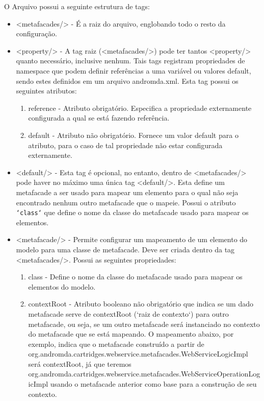O Arquivo possui a seguinte estrutura de tags:

\begin{itemize}
  \item <metafacades/> - É a raiz do arquivo, englobando todo o resto da 
  configuração. 
  \item <property/> - A tag raiz (<metafacades/>) pode ter tantos <property/>
  quanto necessário, inclusive nenhum. Tais tags registram propriedades
  de namespace que podem definir referências a uma variável ou valores default,
  sendo estes definidos em um arquivo andromda.xml. Esta tag possui os seguintes
  atributos:
  \begin{enumerate}
    \item reference - Atributo obrigatório. Especifica a propriedade
    externamente configurada a qual se está fazendo referência.
    \item default - Atributo não obrigatório. Fornece um valor default para o
    atributo, para o caso de tal propriedade não estar configurada externamente.
  \end{enumerate}
  
  \item <default/> - Esta tag é opcional, no entanto, dentro de <metafacades/>
  pode haver no máximo uma única tag <default/>. Esta define um metafacade a ser
  usado para mapear um elemento para o qual não seja encontrado nenhum outro
  metafacade que o mapeie. Possui o atributo \texttt{`class`} que define o nome
  da classe do metafacade usado para mapear os elementos. 
  \item <metafacade/> - Permite configurar um mapeamento de um elemento do
  modelo para uma classe de metafacade. Deve ser criada dentro da tag
  <metafacades/>. Possui as seguintes propriedades:
  \begin{enumerate}
    \item class - Define o nome
  da classe do metafacade usado para mapear os elementos do modelo.
    \item contextRoot - Atributo booleano não obrigatório que indica se
    um dado metafacade serve de contextRoot (`raiz de contexto`) para
    outro metafacade, ou seja, se um outro metafacade será instanciado
    no contexto do metafacade que se está mapeando. O mapeamento abaixo, por
    exemplo, indica que o metafacade construído a partir de
    org.andromda.cartridges.webservice.metafacades.WebServiceLogicImpl será
    contextRoot, já que teremos 
    org.andromda.cartridges.webservice.metafacades.WebServiceOperationLogicImpl
    usando o metafacade anterior como base para a construção de seu contexto.
    

\end{enumerate}
\end{itemize}
